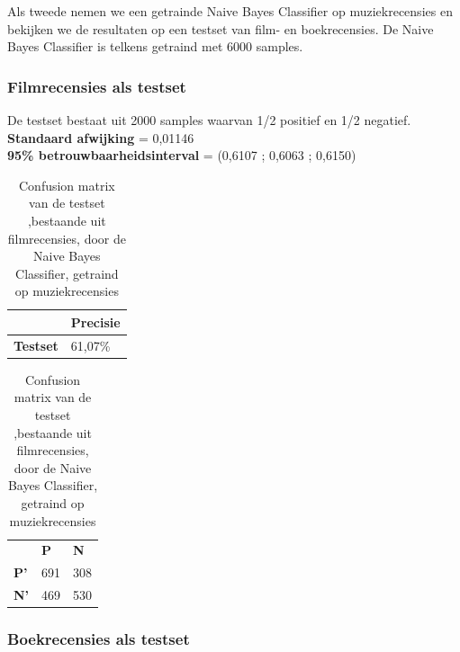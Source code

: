 Als tweede nemen we een getrainde Naive Bayes Classifier op muziekrecensies en bekijken we de resultaten op een testset van film- en boekrecensies. De Naive Bayes Classifier is telkens getraind met 6000 samples.

\subsubsection{Filmrecensies als testset}\label{Filmrecensies als testset}

De testset bestaat uit 2000 samples waarvan 1/2 positief en 1/2 negatief.\\

\textbf{Standaard afwijking} = 0,01146\\
\textbf{95\% betrouwbaarheidsinterval} = (0,6107 ; 0,6063 ; 0,6150)\\
 
\begin{table}[h]
\centering
\setlength\tabcolsep{4pt}
\begin{minipage}{0.48\textwidth}
\centering
\begin{tabular}{l|l|}
\cline{2-2}
                                            & \textbf{Precisie} \\ \hline
\multicolumn{1}{|l|}{\textbf{Testset}}      & 61,07\%           \\ \hline
\end{tabular}
\caption{Classificatieprecisie Naive Bayes Classifier, getraind op muziekrecensies, getest op filmrecensies}
\end{minipage}%
\hfill
\begin{minipage}{0.48\textwidth}
\centering
\begin{tabular}{lll}
                                 & \textbf{P}               & \textbf{N}               \\ \cline{2-3} 
\multicolumn{1}{l|}{\textbf{P'}} & \multicolumn{1}{l|}{691} & \multicolumn{1}{l|}{308} \\ \cline{2-3} 
\multicolumn{1}{l|}{\textbf{N'}} & \multicolumn{1}{l|}{469} & \multicolumn{1}{l|}{530} \\ \cline{2-3} 
\end{tabular}
\caption{Confusion matrix van de testset ,bestaande uit filmrecensies, door de  Naive Bayes Classifier, getraind op muziekrecensies} 
\end{minipage}
\end{table}

\subsubsection{Boekrecensies als testset}\label{Boekrecensies als testset}


